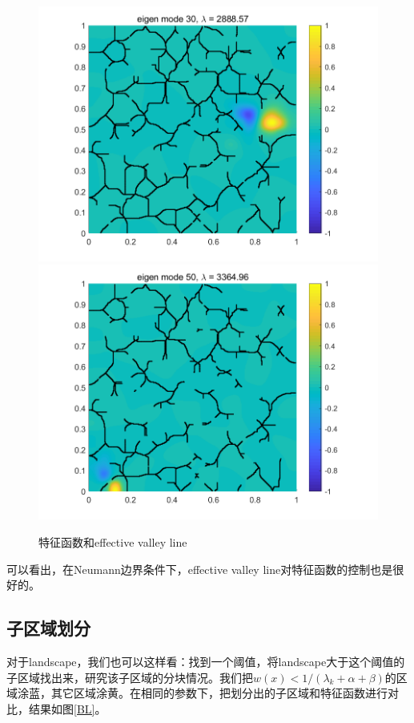 \documentclass[12pt,a4paper]{article}
\begin{document}
\begin{figure}[htbp]
\includegraphics[width=0.3\linewidth]{valley/U(30)}
\includegraphics[width=0.3\linewidth]{valley/U(50)}
\caption{特征函数和effective valley line}
\label{VL2}
\end{figure}

可以看出，在Neumann边界条件下，effective valley line对特征函数的控制也是很好的。

\subsection{子区域划分}

对于landscape，我们也可以这样看：找到一个阈值，将landscape大于这个阈值的子区域找出来，研究该子区域的分块情况。我们把$w(x) < 1/(\lambda_k + \alpha + \beta)$的区域涂蓝，其它区域涂黄。在相同的参数下，把划分出的子区域和特征函数进行对比，结果如图\ref{BL}。
\end{document}
